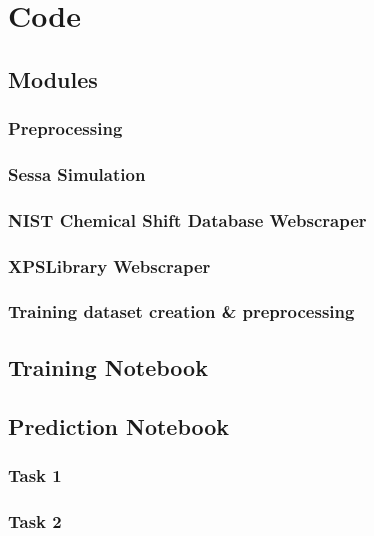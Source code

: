 

\chapter{Code} %

\label{AppendixA} %

\section{Modules}

\subsection{Preprocessing}
\label{preprocessing}


\subsection{Sessa Simulation}
\label{Sessa_Module}


\subsection{NIST Chemical Shift Database Webscraper}
\label{NIST_WebScraper}


\subsection{XPSLibrary Webscraper}
\label{xpslibrary_webscraper}



\subsection{Training dataset creation \& preprocessing}
\label{train_data_generation}



\section{Training Notebook}

\section{Prediction Notebook}

\subsection{Task 1}

\subsection{Task 2}